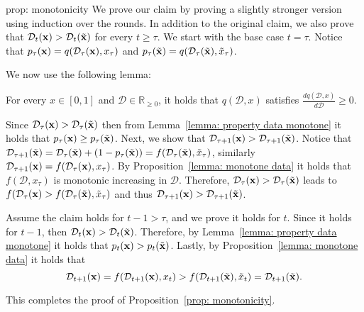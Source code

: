 \begin{proofof}{prop: monotonicity}
We prove our claim by proving a slightly stronger version using induction over the rounds. In addition to the original claim, we also prove that $\mathcal{D}_t({\bf{x}}) > \mathcal{D}_t(\tilde{{\bf{x}}})$ for every $t \geq \tau$. We start with the base case $t = \tau$. Notice that $p_\tau({\bf{x}}) = q(\mathcal{D}_\tau({\bf{x}}), x_\tau)$ and $p_\tau(\tilde{{\bf{x}}}) = q(\mathcal{D}_\tau(\tilde{{\bf{x}}}), \tilde{x}_\tau)$. 

We now use the following lemma:
\begin{lemma} \label{lemma: property data monotone}
For every $x \in [0, 1]$ and $\mathcal{D} \in \mathbb{R}_{\geq 0}$, it holds that $q(\mathcal{D}, x)$ satisfies $\frac{dq(\mathcal{D}, x)}{d\mathcal{D}} \geq 0$.
\end{lemma}
Since $\mathcal{D}_\tau ({\bf{x}}) > \mathcal{D}_\tau (\tilde{{\bf{x}}})$ then from Lemma~\ref{lemma: property data monotone} it holds that $p_\tau({\bf{x}}) \geq p_\tau (\tilde{{\bf{x}}})$. Next, we show that $\mathcal{D}_{\tau+1} ({\bf{x}}) > \mathcal{D}_{\tau+1} (\tilde{{\bf{x}}})$. Notice that $\mathcal{D}_{\tau+1} (\tilde{{\bf{x}}}) = \mathcal{D}_{\tau} (\tilde{{\bf{x}}}) + (1-p_\tau(\tilde{{\bf{x}}})) = f(\mathcal{D}_{\tau} (\tilde{{\bf{x}}}), \tilde{x}_{\tau})$, similarly $\mathcal{D}_{\tau+1} ({\bf{x}}) = f(\mathcal{D}_{\tau} ({\bf{x}}), x_\tau)$. By Proposition~\ref{lemma: monotone data} it holds that $f(\mathcal{D}, x_\tau)$ is monotonic increasing in $\mathcal{D}$. Therefore, $\mathcal{D}_\tau ({\bf{x}}) > \mathcal{D}_\tau(\tilde{{\bf{x}}})$ leads to $f(\mathcal{D}_{\tau} ({\bf{x}}) > f(\mathcal{D}_{\tau} (\tilde{{\bf{x}}}), \tilde{x}_{\tau})$ and thus $\mathcal{D}_{\tau+1} ({\bf{x}}) > \mathcal{D}_{\tau+1} (\tilde{{\bf{x}}})$. 

Assume the claim holds for $t-1 > \tau$, and we prove it holds for $t$. Since it holds for $t-1$, then $\mathcal{D}_t({\bf{x}}) > \mathcal{D}_t(\tilde{{\bf{x}}})$. Therefore, by Lemma~\ref{lemma: property data monotone} it holds that $p_t({\bf{x}}) > p_t(\tilde{{\bf{x}}})$. Lastly, by Proposition~\ref{lemma: monotone data} it holds that
\[
\mathcal{D}_{t+1}({\bf{x}}) = f(\mathcal{D}_{t+1}({\bf{x}}), x_t) > f(\mathcal{D}_{t+1}(\tilde{{\bf{x}}}), \tilde{x}_t) = \mathcal{D}_{t+1}(\tilde{{\bf{x}}}).
\]

This completes the proof of Proposition~\ref{prop: monotonicity}.
\end{proofof}

